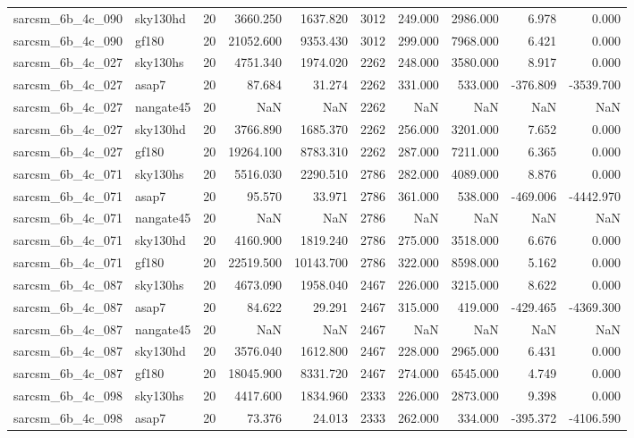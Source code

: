 \begin{tabular}{llrrrrrrrr}
sarcsm\_6b\_4c\_090 & sky130hd & 20 & 3660.250 & 1637.820 & 3012 & 249.000 & 2986.000 & 6.978 & 0.000 \\
sarcsm\_6b\_4c\_090 & gf180 & 20 & 21052.600 & 9353.430 & 3012 & 299.000 & 7968.000 & 6.421 & 0.000 \\
sarcsm\_6b\_4c\_027 & sky130hs & 20 & 4751.340 & 1974.020 & 2262 & 248.000 & 3580.000 & 8.917 & 0.000 \\
sarcsm\_6b\_4c\_027 & asap7 & 20 & 87.684 & 31.274 & 2262 & 331.000 & 533.000 & -376.809 & -3539.700 \\
sarcsm\_6b\_4c\_027 & nangate45 & 20 & NaN & NaN & 2262 & NaN & NaN & NaN & NaN \\
sarcsm\_6b\_4c\_027 & sky130hd & 20 & 3766.890 & 1685.370 & 2262 & 256.000 & 3201.000 & 7.652 & 0.000 \\
sarcsm\_6b\_4c\_027 & gf180 & 20 & 19264.100 & 8783.310 & 2262 & 287.000 & 7211.000 & 6.365 & 0.000 \\
sarcsm\_6b\_4c\_071 & sky130hs & 20 & 5516.030 & 2290.510 & 2786 & 282.000 & 4089.000 & 8.876 & 0.000 \\
sarcsm\_6b\_4c\_071 & asap7 & 20 & 95.570 & 33.971 & 2786 & 361.000 & 538.000 & -469.006 & -4442.970 \\
sarcsm\_6b\_4c\_071 & nangate45 & 20 & NaN & NaN & 2786 & NaN & NaN & NaN & NaN \\
sarcsm\_6b\_4c\_071 & sky130hd & 20 & 4160.900 & 1819.240 & 2786 & 275.000 & 3518.000 & 6.676 & 0.000 \\
sarcsm\_6b\_4c\_071 & gf180 & 20 & 22519.500 & 10143.700 & 2786 & 322.000 & 8598.000 & 5.162 & 0.000 \\
sarcsm\_6b\_4c\_087 & sky130hs & 20 & 4673.090 & 1958.040 & 2467 & 226.000 & 3215.000 & 8.622 & 0.000 \\
sarcsm\_6b\_4c\_087 & asap7 & 20 & 84.622 & 29.291 & 2467 & 315.000 & 419.000 & -429.465 & -4369.300 \\
sarcsm\_6b\_4c\_087 & nangate45 & 20 & NaN & NaN & 2467 & NaN & NaN & NaN & NaN \\
sarcsm\_6b\_4c\_087 & sky130hd & 20 & 3576.040 & 1612.800 & 2467 & 228.000 & 2965.000 & 6.431 & 0.000 \\
sarcsm\_6b\_4c\_087 & gf180 & 20 & 18045.900 & 8331.720 & 2467 & 274.000 & 6545.000 & 4.749 & 0.000 \\
sarcsm\_6b\_4c\_098 & sky130hs & 20 & 4417.600 & 1834.960 & 2333 & 226.000 & 2873.000 & 9.398 & 0.000 \\
sarcsm\_6b\_4c\_098 & asap7 & 20 & 73.376 & 24.013 & 2333 & 262.000 & 334.000 & -395.372 & -4106.590 \\

\end{tabular}

